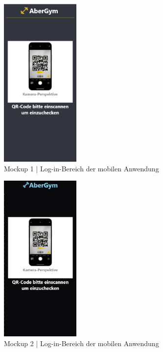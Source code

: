 \begin{figure}[!htb]
    \centering
    \includegraphics[width=0.35\textwidth]{pics/log1.png}
    \caption{Mockup 1 | Log-in-Bereich der mobilen Anwendung}
    \label{fig:log1}
\end{figure}
\begin{figure}[!htb]
    \centering
    \includegraphics[width=0.35\textwidth]{pics/log2.png}
    \caption{Mockup 2 | Log-in-Bereich der mobilen Anwendung}
    \label{fig:log2}
\end{figure}
\FloatBarrier

